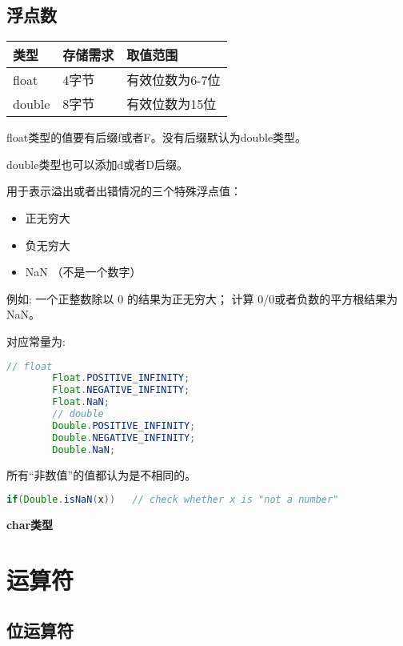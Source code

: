 \subsection{浮点数}


\renewcommand\arraystretch{2}
\begin{tabular}{l|l|l}
    类型         &      存储需求        &     取值范围        \\               \hline
    float        &       4字节          & 有效位数为6-7位      \\
    double      &       8字节          & 有效位数为15位       \\
\end{tabular}\newline


float类型的值要有后缀f或者F。没有后缀默认为double类型。

double类型也可以添加d或者D后缀。


用于表示溢出或者出错情况的三个特殊浮点值：

\begin{itemize}
        \item   正无穷大  
        \item   负无穷大
        \item   NaN （不是一个数字）
\end{itemize}

例如: 一个正整数除以 0 的结果为正无穷大； 计算 0/0或者负数的平方根结果为NaN。

对应常量为:
\begin{lstlisting}[language=java]
        // float
        Float.POSITIVE_INFINITY;
        Float.NEGATIVE_INFINITY;
        Float.NaN;
        // double
        Double.POSITIVE_INFINITY;
        Double.NEGATIVE_INFINITY;
        Double.NaN;
\end{lstlisting}


所有“非数值”的值都认为是不相同的。

\begin{lstlisting}[language=java]
        if(Double.isNaN(x))   // check whether x is "not a number"
\end{lstlisting}




\textbf{char类型}


\section{运算符}

\subsection{位运算符}


